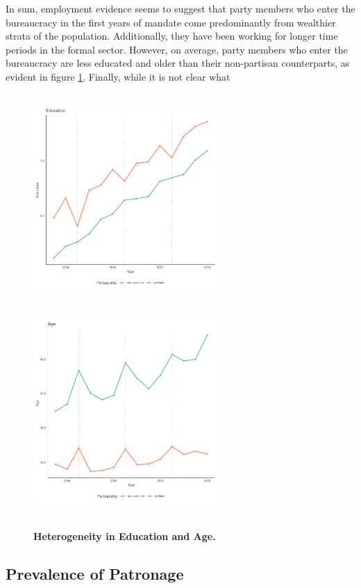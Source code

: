 \documentclass[12pt,a4paper]{article}
\begin{document}
In sum, employment evidence seems to suggest that party members who enter the bureaucracy in the first years of mandate come predominantly from wealthier strata of the population. Additionally, they have been working for longer time periods in the formal sector. However, on average, party members who enter the bureaucracy are less educated and older than their non-partisan counterparts, as evident in figure \ref{fig:partisan_edu_et_age}. Finally, while it is not clear what 

\begin{figure}[H]
    \centering
    \includegraphics[width = 7cm, height = 8cm]{figures/partisanship/plot_edu_mean.pdf}
    \includegraphics[width = 7cm, height = 8cm]{figures/partisanship/plot_age_mean.pdf}
    \caption{\textbf{Heterogeneity in Education and Age.}}
    \label{fig:partisan_edu_et_age}
\end{figure}

\subsection{Prevalence of Patronage}
\label{sec:prevalence_patronage}
\end{document}
